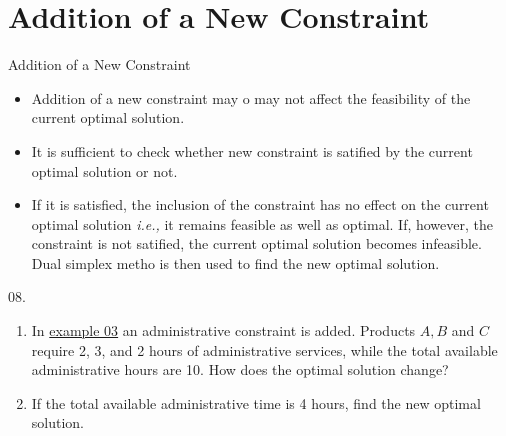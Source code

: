 
\section{Addition of a New Constraint}
\label{sec:addition-new-constraint}

\begin{frame}{Addition of a New Constraint}
  \begin{itemize} \justifying \parskip4mm
  \item Addition of a new constraint may o may not affect the feasibility of the current optimal solution.
  \item It is sufficient to check whether new constraint is satified by the current optimal solution or not.
  \item If it is satisfied, the inclusion of the constraint has no effect on the current optimal solution \emph{i.e.,} it remains feasible as well as optimal. If, however, the constraint is not satified, the current \alert{optimal solution becomes infeasible. Dual simplex metho is then used to find the new optimal solution.}
  \end{itemize}
\end{frame}

\begin{frameExample}{08.}{}
  
  \begin{enumerate}[label=\alph*)] \justifying \parskip4mm
  \item In \hyperlink{example03}{example 03} an administrative constraint is added. Products $A, B$ and $C$ require 2, 3, and 2 hours of administrative services, while the total available administrative hours are 10. How does the optimal solution change?
  \item \label{example08} If the total available administrative time is 4 hours, find the new optimal solution.
  \end{enumerate}
\end{frameExample}

